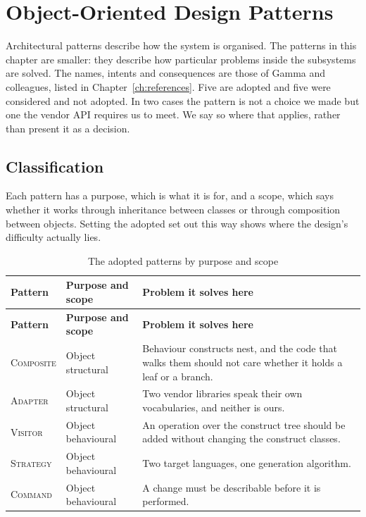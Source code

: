 \chapter{Object-Oriented Design Patterns}
\label{ch:design-patterns}

Architectural patterns describe how the system is organised. The patterns in
this chapter are smaller: they describe how particular problems inside the
subsystems are solved. The names, intents and consequences are those of Gamma
and colleagues, listed in Chapter~\ref{ch:references}. Five are adopted and five
were considered and not adopted. In two cases the pattern is not a choice we
made but one the vendor API requires us to meet. We say so where that applies,
rather than present it as a decision.

\section{Classification}

Each pattern has a purpose, which is what it is for, and a scope, which says
whether it works through inheritance between classes or through composition
between objects. Setting the adopted set out this way shows where the design's
difficulty actually lies.

\begin{longtable}{L{0.17\textwidth}L{0.23\textwidth}L{0.52\textwidth}}
	\caption{The adopted patterns by purpose and scope}\label{tab:classification}\\
	\toprule
	\textbf{Pattern} & \textbf{Purpose and scope} & \textbf{Problem it solves here} \\
	\midrule
	\endfirsthead
	\toprule
	\textbf{Pattern} & \textbf{Purpose and scope} & \textbf{Problem it solves here} \\
	\midrule
	\endhead

	\textsc{Composite} & Object structural & Behaviour constructs nest, and the
	code that walks them should not care whether it holds a leaf or a
	branch. \\
	\addlinespace
	\textsc{Adapter} & Object structural & Two vendor libraries speak their own
	vocabularies, and neither is ours. \\
	\addlinespace
	\textsc{Visitor} & Object behavioural & An operation over the construct tree
	should be added without changing the construct classes. \\
	\addlinespace
	\textsc{Strategy} & Object behavioural & Two target languages, one
	generation algorithm. \\
	\addlinespace
	\textsc{Command} & Object behavioural & A change must be describable before
	it is performed. \\
	\bottomrule
\end{longtable}

